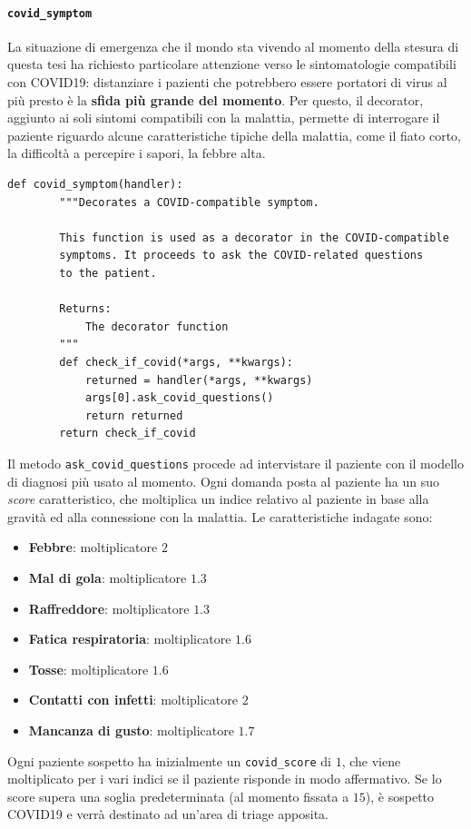 \paragraph{\texttt{covid\_symptom}} La situazione di emergenza che il mondo sta vivendo al momento della stesura di questa tesi ha richiesto particolare attenzione verso le sintomatologie compatibili con COVID19: distanziare i pazienti che potrebbero essere portatori di virus al più presto è la \textbf{sfida più grande del momento}. Per questo, il decorator, aggiunto ai soli sintomi compatibili con la malattia, permette di interrogare il paziente riguardo alcune caratteristiche tipiche della malattia, come il fiato corto, la difficoltà a percepire i sapori, la febbre alta.
\begin{verbatim}
def covid_symptom(handler):
        """Decorates a COVID-compatible symptom.

        This function is used as a decorator in the COVID-compatible
        symptoms. It proceeds to ask the COVID-related questions
        to the patient.

        Returns:
            The decorator function
        """
        def check_if_covid(*args, **kwargs):
            returned = handler(*args, **kwargs)
            args[0].ask_covid_questions()
            return returned
        return check_if_covid
\end{verbatim}
Il metodo \texttt{ask\_covid\_questions} procede ad intervistare il paziente con il modello di diagnosi più usato al momento. Ogni domanda posta al paziente ha un suo \textit{score} caratteristico, che moltiplica un indice relativo al paziente in base alla gravità ed alla connessione con la malattia. Le caratteristiche indagate sono:
\begin{itemize}
    \item \textbf{Febbre}: moltiplicatore $2$
    \item \textbf{Mal di gola}: moltiplicatore $1.3$
    \item \textbf{Raffreddore}: moltiplicatore $1.3$
    \item \textbf{Fatica respiratoria}: moltiplicatore $1.6$
    \item \textbf{Tosse}: moltiplicatore $1.6$
    \item \textbf{Contatti con infetti}: moltiplicatore $2$
    \item \textbf{Mancanza di gusto}: moltiplicatore $1.7$
\end{itemize}
Ogni paziente sospetto ha inizialmente un \texttt{covid\_score} di $1$, che viene moltiplicato per i vari indici se il paziente risponde in modo affermativo. Se lo score supera una soglia predeterminata (al momento fissata a $15$), è sospetto COVID19 e verrà destinato ad un'area di triage apposita.
